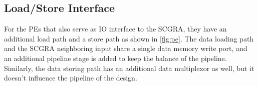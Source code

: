 \subsection{Load/Store Interface}
For the PEs that also serve as IO interface to the SCGRA, they have an additional load path and a store path as shown in \ref{fig:pe}. The data loading path and the SCGRA neighboring input share a single data memory write port, and an additional pipeline stage is added to keep the balance of the pipeline.
Similarly, the data storing path has an additional data multiplexor as well, but it doesn't influence the pipeline of the design. 



